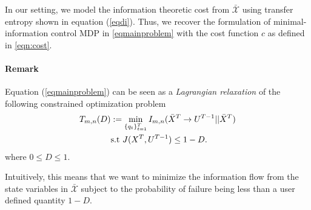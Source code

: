 

In our setting, we model the information theoretic cost from $\mathcal{\bar{X}}$ using transfer entropy shown in equation (\ref{eqdi}). Thus, we recover the formulation of minimal-information control MDP in \eqref{eqmainproblem} with the cost function $c$ as defined in \eqref{eqn:cost}. 

\paragraph*{Remark} Equation (\ref{eqmainproblem}) can be seen as a \emph{Lagrangian relaxation} of the following constrained optimization problem
\vspace{-0.5cm}
\begin{align}\label{eqn:constopt}
T_{m,n}(D) & := \min_{\{q_t\}_{t=1}^T} I_{m,n}(\bar{X}^T \rightarrow U^{T-1}||\bar{X}^T) \\
& \textrm{s.t } J(X^{T},U^{T-1}) \leq 1 - D. \nonumber
\end{align}
where $0\leq D \leq 1$.

Intuitively, this means that we want to minimize the information flow from the state variables in $\mathcal{\bar{X}}$ subject to the probability of failure being less than a user defined quantity $1-D$. 


